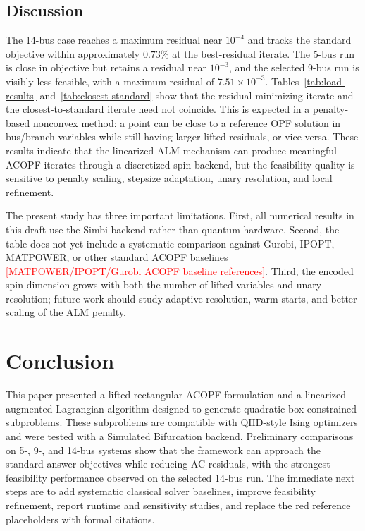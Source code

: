 \documentclass[journal]{IEEEtran}
\newcommand{\needref}[1]{\textcolor{red}{[#1]}}
\begin{document}
\subsection{Discussion}
The 14-bus case reaches a maximum residual near $10^{-4}$ and tracks the standard objective within approximately $0.73\%$ at the best-residual iterate. The 5-bus run is close in objective but retains a residual near $10^{-3}$, and the selected 9-bus run is visibly less feasible, with a maximum residual of $7.51\times10^{-3}$. Tables~\ref{tab:load-results} and~\ref{tab:closest-standard} show that the residual-minimizing iterate and the closest-to-standard iterate need not coincide. This is expected in a penalty-based nonconvex method: a point can be close to a reference OPF solution in bus/branch variables while still having larger lifted residuals, or vice versa. These results indicate that the linearized ALM mechanism can produce meaningful ACOPF iterates through a discretized spin backend, but the feasibility quality is sensitive to penalty scaling, stepsize adaptation, unary resolution, and local refinement.

The present study has three important limitations. First, all numerical results in this draft use the Simbi backend rather than quantum hardware. Second, the table does not yet include a systematic comparison against Gurobi, IPOPT, MATPOWER, or other standard ACOPF baselines \needref{MATPOWER/IPOPT/Gurobi ACOPF baseline references}. Third, the encoded spin dimension grows with both the number of lifted variables and unary resolution; future work should study adaptive resolution, warm starts, and better scaling of the ALM penalty.

\section{Conclusion}
This paper presented a lifted rectangular ACOPF formulation and a linearized augmented Lagrangian algorithm designed to generate quadratic box-constrained subproblems. These subproblems are compatible with QHD-style Ising optimizers and were tested with a Simulated Bifurcation backend. Preliminary comparisons on 5-, 9-, and 14-bus systems show that the framework can approach the standard-answer objectives while reducing AC residuals, with the strongest feasibility performance observed on the selected 14-bus run. The immediate next steps are to add systematic classical solver baselines, improve feasibility refinement, report runtime and sensitivity studies, and replace the red reference placeholders with formal citations.
\end{document}
